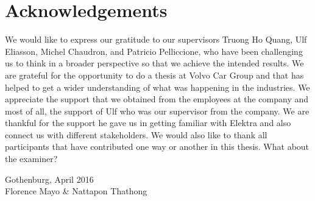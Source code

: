 \thispagestyle{plain}			%

\section*{Acknowledgements}
We would like to express our gratitude to our supervisors Truong Ho Quang, Ulf Eliasson, Michel Chaudron, and Patricio Pelliccione, who have been challenging us to think in a broader perspective so that we achieve the intended results. We are grateful for the opportunity to do a thesis at Volvo Car Group and that has helped to get a wider understanding of what was happening in the industries. We appreciate the support that we obtained from the employees at the company and most of all, the support of Ulf who was our supervisor from the company. We are thankful for the support he gave us in getting familiar with Elektra and also connect us with different stakeholders.
We would also like to thank all participants that have contributed one way or another in this thesis.
What about the examiner? \todo{[to be filled in]}

\vspace{1.5cm}
\hfill
\begin{flushright}Gothenburg, April 2016\\
Florence Mayo \& Nattapon Thathong
\end{flushright}

\thispagestyle{empty}
\mbox{}